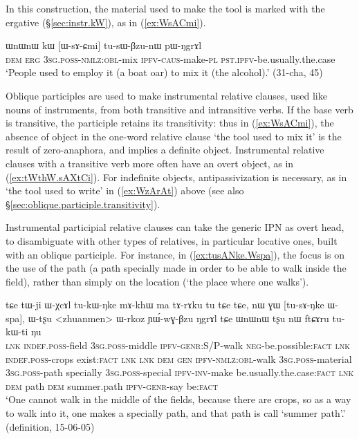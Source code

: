 In this construction, the material used to make the tool is marked with the ergative (§\ref{sec:instr.kW}), as in (\ref{ex:WsACmi}).

\begin{exe}
\ex \label{ex:WsACmi}
\gll ɯnɯnɯ kɯ [ɯ-sɤ-ɕmi] tu-sɯ-βzu-nɯ pɯ-ŋgrɤl \\
\textsc{dem} \textsc{erg} \textsc{3sg}.\textsc{poss}-\textsc{nmlz}:\textsc{obl}-mix \textsc{ipfv}-\textsc{caus}-make-\textsc{pl} \textsc{pst}.\textsc{ipfv}-be.usually.the.case \\
\glt `People used to employ it (a boat oar) to mix it (the alcohol).' (31-cha, 45)
\end{exe}  

Oblique participles are used to make instrumental relative clauses, used like nouns of instruments, from both transitive and intransitive verbs. If the base verb is transitive, the participle retains its transitivity: thus in (\ref{ex:WsACmi}), the absence of object in the one-word relative clause  `the tool used to mix it' is the result of zero-anaphora, and implies a definite object. Instrumental relative clauses with a transitive verb more often have an overt object, as in (\ref{ex:tWthW.sAXtCi}). For indefinite objects, antipassivization is necessary, as in  `the tool used to write' in (\ref{ex:WzArAt}) above (see also  §\ref{sec:oblique.participle.transitivity}). 

Instrumental participial relative clauses can take the generic IPN  as overt head, to disambiguate with other types of relatives, in particular locative ones, built with an oblique participle. For instance, in (\ref{ex:tusANke.Wspa}), the focus is on the use of the path (a path specially made in order to be able to walk inside the field), rather than simply on the location (`the place where one walks').

\begin{exe}
\ex \label{ex:tusANke.Wspa}
\gll tɕe tɯ-ji ɯ-χcɤl tu-kɯ-ŋke mɤ-khɯ ma tɤ-rɤku tu tɕe tɕe, nɯ ɣɯ [tu-sɤ-ŋke ɯ-spa], ɯ-tʂu <zhuanmen> ɯ-rkoz ɲɯ́-wɣ-βzu ŋgrɤl tɕe ɯnɯnɯ tʂu nɯ ftɕɤru tu-kɯ-ti ŋu \\
\textsc{lnk} \textsc{indef}.\textsc{poss}-field \textsc{3sg}.\textsc{poss}-middle \textsc{ipfv}-\textsc{genr}:S/P-walk \textsc{neg}-be.possible:\textsc{fact} \textsc{lnk} \textsc{indef}.\textsc{poss}-crops exist:\textsc{fact} \textsc{lnk} \textsc{lnk} \textsc{dem} \textsc{gen} \textsc{ipfv}-\textsc{nmlz}:\textsc{obl}-walk \textsc{3sg}.\textsc{poss}-material \textsc{3sg}.\textsc{poss}-path specially \textsc{3sg}.\textsc{poss}-special \textsc{ipfv}-\textsc{inv}-make be.usually.the.case:\textsc{fact} \textsc{lnk} \textsc{dem} path \textsc{dem} summer.path \textsc{ipfv}-\textsc{genr}-say be:\textsc{fact} \\
\glt `One cannot walk in the middle of the fields, because there are crops, so as a way to walk into it, one makes a specially path, and that path is call `summer path'.' (definition, 15-06-05)
\end{exe} 
 
